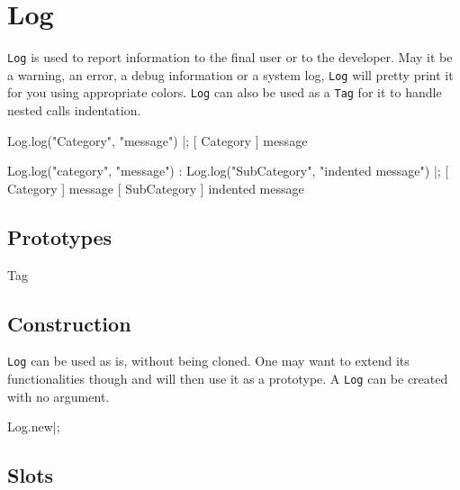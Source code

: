 
\section{Log}

\lstinline|Log| is used to report information to the final user or to
the developer. May it be a warning, an error, a debug information or
a system log, \lstinline|Log| will pretty print it for you using
appropriate colors. \lstinline|Log| can also be used as a
\lstinline|Tag| for it to handle nested calls indentation.

\begin{urbiunchecked}
Log.log("Category", "message") |;
[       Category        ] message

Log.log("category", "message") :
{
  Log.log("SubCategory", "indented message")
}|;
[       Category        ] message
[      SubCategory      ]   indented message
\end{urbiunchecked}

\subsection{Prototypes}
\begin{refObjects}
\item[Tag]
\end{refObjects}

\subsection{Construction}

\lstinline|Log| can be used as is, without being cloned. One may want
to extend its functionalities though and will then use it as a
prototype. A \lstinline|Log| can be created with no argument.

\begin{urbiscript}
Log.new|;
\end{urbiscript}

\subsection{Slots}

